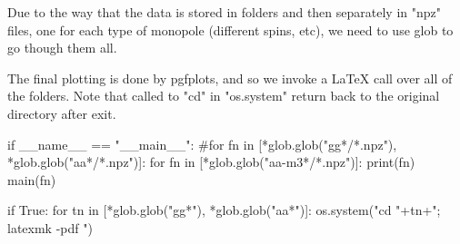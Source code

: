 \documentclass[10pt, a4paper]{article}
\begin{document}
Due to the way that the data is stored in folders and then separately in "npz" files, one for each type of monopole (different spins, etc), we need to use glob to go though them all. 

The final plotting is done by pgfplots, and so we invoke a \LaTeX{} call over all of the folders. Note that called to "cd" in "os.system" return back to the original directory after exit.

\begin{code}
if __name__ == "__main__":
	#for fn in [*glob.glob("gg*/*.npz"), *glob.glob("aa*/*.npz")]:
	for fn in [*glob.glob("aa-m3*/*.npz")]:
		print(fn)
		main(fn)

	if True:
		for tn in [*glob.glob("gg*"), *glob.glob("aa*")]:
			os.system("cd "+tn+"; latexmk -pdf ")
\end{code}
\begin{minipage}{\textwidth}
\printindex
\end{minipage}
\end{document}
